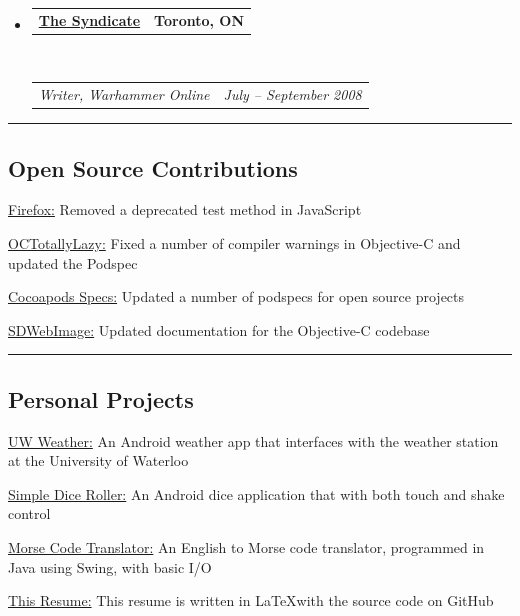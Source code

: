 \documentclass[10pt,letterpaper]{article}
\makeatletter
\newenvironment{indentsection}[1]%
{\begin{list}{}%
	{\setlength{\leftmargin}{#1}}%
	\item[]%
}
{\end{list}}
\newcommand{\headerrow}[2]
{\begin{tabular*}{\linewidth}{l@{\extracolsep{\fill}}r}
	#1 &
	#2 \\
\end{tabular*}}
\makeatother
\begin{document}
\begin{itemize}
	\item
	\headerrow
		{\textbf{\href{https://llts.org}{The Syndicate}}}
		{\textbf{Toronto, ON}}
	\\
	\headerrow
		{\emph{Writer, Warhammer Online}}
		{\emph{July -- September 2008}}

\end{itemize}

\hrule
\vspace{-0.4em}
\subsection*{Open Source Contributions}
	\begin{indentsection}{\parindent}
	\begin{description*}
		\item[\href{https://mozilla.org}{Firefox:}] Removed a deprecated test method in JavaScript
		\item[\href{https://github.com/stuartervine/octotallylazy}{OCTotallyLazy:}] Fixed a number of compiler warnings in Objective-C and updated the Podspec
		\item[\href{https://github.com/CocoaPods/Specs}{Cocoapods Specs:}]  Updated a number of podspecs for open source projects	
		\item[\href{https://github.com/rs/sdwebimage}{SDWebImage:}] Updated documentation for the Objective-C codebase
	\end{description*}
	\end{indentsection}

\hrule
\vspace{-0.4em}
\subsection*{Personal Projects}
	\begin{indentsection}{\parindent}
	\begin{description*}
		\item[\href{https://github.com/Kapin/Waterloo-Weather}{UW Weather:}] An Android weather app that interfaces with the weather station at the University of Waterloo
		\item[\href{https://github.com/Kapin/Dice-Roller}{Simple Dice Roller:}] An Android dice application that with both touch and shake control	
		\item[\href{https://github.com/Kapin/Morse-Code-Translator}{Morse Code Translator:}] An English to Morse code translator, programmed in Java using Swing, with basic I/O
		\item[\href{https://github.com/kapin/resume}{This Resume:}] This resume is written in \LaTeX with the source code on GitHub
	\end{description*}
	\end{indentsection}
\end{document}
